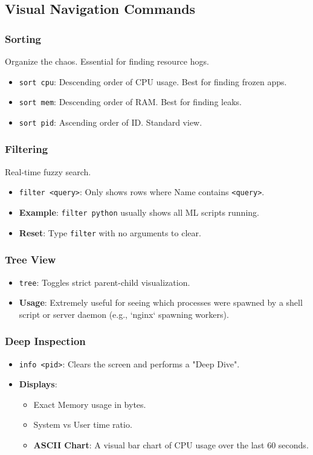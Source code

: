 \documentclass[a4paper,12pt]{article}
\begin{document}
\subsection{Visual Navigation Commands}

\subsubsection{Sorting}
Organize the chaos. Essential for finding resource hogs.
\begin{itemize}
    \item \texttt{sort cpu}: Descending order of CPU usage. Best for finding frozen apps.
    \item \texttt{sort mem}: Descending order of RAM. Best for finding leaks.
    \item \texttt{sort pid}: Ascending order of ID. Standard view.
\end{itemize}

\subsubsection{Filtering}
Real-time fuzzy search.
\begin{itemize}
    \item \texttt{filter <query>}: Only shows rows where Name contains \texttt{<query>}.
    \item \textbf{Example}: \texttt{filter python} usually shows all ML scripts running.
    \item \textbf{Reset}: Type \texttt{filter} with no arguments to clear.
\end{itemize}

\subsubsection{Tree View}
\begin{itemize}
    \item \texttt{tree}: Toggles strict parent-child visualization.
    \item \textbf{Usage}: Extremely useful for seeing which processes were spawned by a shell script or server daemon (e.g., `nginx` spawning workers).
\end{itemize}

\subsubsection{Deep Inspection}
\begin{itemize}
    \item \texttt{info <pid>}: Clears the screen and performs a "Deep Dive".
    \item \textbf{Displays}:
        \begin{itemize}
            \item Exact Memory usage in bytes.
            \item System vs User time ratio.
            \item \textbf{ASCII Chart}: A visual bar chart of CPU usage over the last 60 seconds.
        \end{itemize}
\end{itemize}
\end{document}
